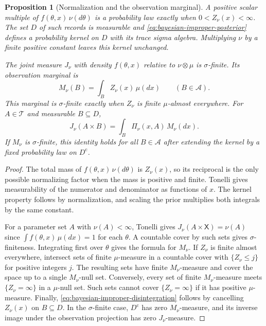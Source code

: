 \documentclass[11pt,oneside]{book}
\newtheorem{proposition}[theorem]{Proposition}
\theoremstyle{definition}
\theoremstyle{remark}
\begin{document}
\begin{proposition}[Normalization and the observation marginal]
\label{prop:bayesian-improper-normalization}
A positive scalar multiple of $f(\theta,x)\,\nu(d\theta)$ is a
probability law exactly when $0<Z_\nu(x)<\infty$. The set $D$
of such records is measurable and \eqref{eq:bayesian-improper-posterior}
defines a probability kernel on $D$ with its trace sigma algebra.
Multiplying $\nu$ by a finite positive constant leaves this
kernel unchanged.

The joint measure $J_\nu$ with density $f(\theta,x)$ relative
to $\nu\otimes\mu$ is $\sigma$-finite. Its observation marginal is
\[
M_\nu(B)=\int_B Z_\nu(x)\,\mu(dx)\qquad(B\in\mathcal A).
\]
This marginal is $\sigma$-finite exactly when $Z_\nu$ is finite
$\mu$-almost everywhere. For $A\in\mathcal T$ and measurable $B\subseteq D$,
\begin{equation}
J_\nu(A\times B)=\int_B \Pi_\nu(x,A)\,M_\nu(dx).
\label{eq:bayesian-improper-disintegration}
\end{equation}
If $M_\nu$ is $\sigma$-finite, this identity holds for all $B\in\mathcal A$
after extending the kernel by a fixed probability law on $D^{\mathrm c}$.
\end{proposition}
\begin{proof}
The total mass of $f(\theta,x)\,\nu(d\theta)$ is $Z_\nu(x)$,
so its reciprocal is the only possible normalizing factor
when the mass is positive and finite. Tonelli gives
measurability of the numerator and denominator as functions
of $x$. The kernel property follows by normalization, and
scaling the prior multiplies both integrals by the same constant.

For a parameter set $A$ with $\nu(A)<\infty$, Tonelli gives
$J_\nu(A\times\mathsf X)=\nu(A)$ since
$\int f(\theta,x)\,\mu(dx)=1$ for each $\theta$. A countable
cover by such sets gives $\sigma$-finiteness. Integrating first
over $\theta$ gives the formula for $M_\nu$. If $Z_\nu$ is finite
almost everywhere, intersect sets of finite $\mu$-measure in
a countable cover with $\{Z_\nu\leq j\}$ for positive integers
$j$. The resulting sets have finite $M_\nu$-measure and cover
the space up to a single $M_\nu$-null set. Conversely, every
set of finite $M_\nu$-measure meets $\{Z_\nu=\infty\}$ in a
$\mu$-null set. Such sets cannot cover $\{Z_\nu=\infty\}$ if
it has positive $\mu$-measure. Finally,
\eqref{eq:bayesian-improper-disintegration} follows by cancelling
$Z_\nu(x)$ on $B\subseteq D$. In the $\sigma$-finite case, $D^{\mathrm c}$
has zero $M_\nu$-measure, and its inverse image under the observation
projection has zero $J_\nu$-measure.
\end{proof}
\end{document}
